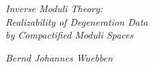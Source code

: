\documentclass[11pt,letterpaper,twoside]{article}
\theoremstyle{plain}
\theoremstyle{definition}
\theoremstyle{remark}
\begin{document}
\ifnewstyle
  \markboth{}{}
  \thispagestyle{empty}

  \vspace*{0.55in}

  \begingroup\raggedright
  {\huge\itshape
  Inverse Moduli Theory:\\
  Realizability of Degeneration Data\\
  by Compactified Moduli Spaces\par}

  \baselineskip

  {\itshape\noindent Bernd Johannes Wuebben\par}
  \endgroup

  \begingroup
  \let\thefootnote\relax
  \endgroup

  \vskip 0.65in
\end{document}
